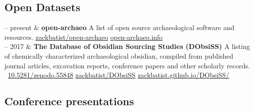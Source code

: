 \documentclass[11pt, a4paper]{article}
\newcommand{\DOI}[1]{\newline \aiDoi\ \href{https://doi.org/#1}{#1}}
\newcommand{\GitHub}[1]{\newline \faGithub \href{https://github.com/#1}{#1}}
\newcommand{\Website}[1]{\newline \faGlobe \href{https://#1}{#1}}
\newcommand{\Duration}[2]{\fontsize{10pt}{0}\selectfont #1 -- #2}
\newcommand{\Ongoing}{present}
\begin{document}
\subsection{Open Datasets}

\begin{EntriesTable}
\Duration{2018}{\Ongoing}  &
  \textbf{open-archaeo}
  A list of open source archaeological software and resources.
  \GitHub{zackbatist/open-archaeo}
  \Website{open-archaeo.info}
  \\
\Duration{2014}{2017}  &
  \textbf{The Database of Obsidian Sourcing Studies (DObsiSS)}
  A listing of chemically characterized archaeological obsidian, compiled from published journal articles, excavation reports, conference papers and other scholarly records.
  \DOI{10.5281/zenodo.55848}
  \GitHub{zackbatist/DObsiSS}
  \Website{zackbatist.github.io/DObsiSS/}
  \\

\end{EntriesTable}


\subsection{Conference presentations}
\end{document}
